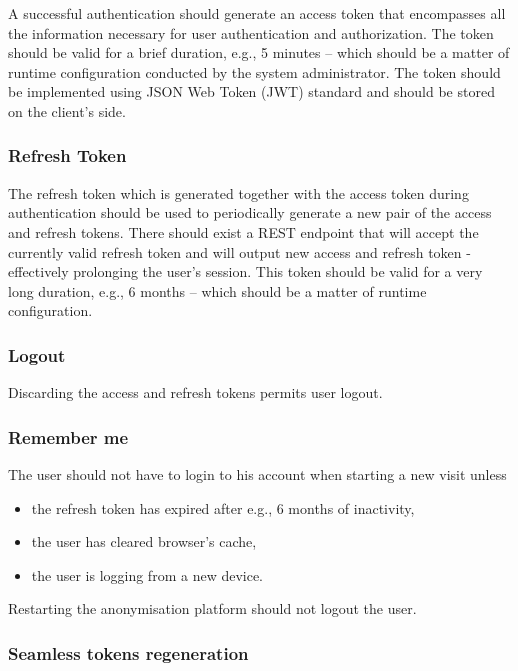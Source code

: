 \documentclass[a4paper,twoside,12pt]{book}
\begin{document}
A successful authentication should generate an access token that encompasses all the information necessary for user authentication and authorization. The token should be valid for a brief duration, e.g., 5 minutes – which should be a matter of runtime configuration conducted by the system administrator. The token should be implemented using JSON Web Token (JWT) standard and should be stored on the client's side.

\subsubsection{Refresh Token}

The refresh token which is generated together with the access token during authentication should be used to periodically generate a new pair of the access and refresh tokens. There should exist a REST endpoint that will accept the currently valid refresh token and will output new access and refresh token - effectively prolonging the user's session. This token should be valid for a very long duration, e.g., 6 months – which should be a matter of runtime configuration.

\subsubsection{Logout}

Discarding the access and refresh tokens permits user logout.

\subsubsection{Remember me}

The user should not have to login to his account when starting a new visit unless
\begin{itemize}
\item the refresh token has expired after e.g., 6 months of inactivity,
\item the user has cleared browser's cache,
\item the user is logging from a new device.
\end{itemize}

Restarting the anonymisation platform should not logout the user.

\subsubsection{Seamless tokens regeneration}
\end{document}
